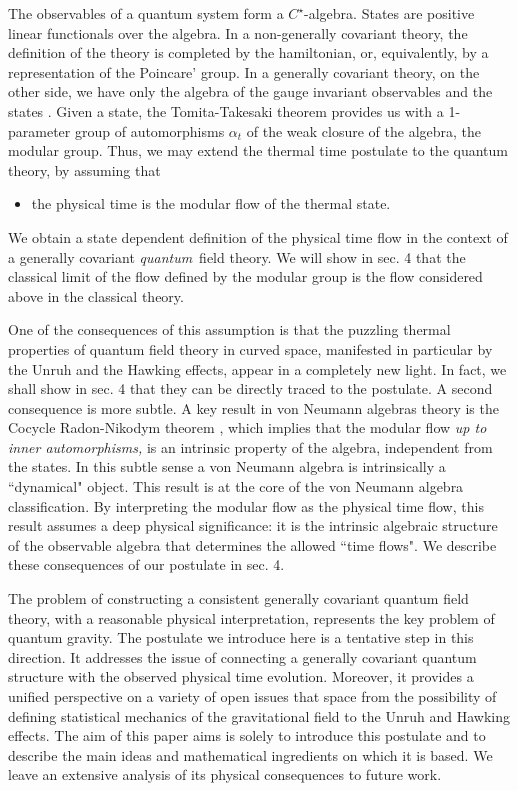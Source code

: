 The observables of a quantum system form a $C^\star$-algebra.
States are positive linear functionals over the algebra.
In a non-generally covariant theory, the definition of the theory
is completed by the hamiltonian, or, equivalently, by a
representation of the Poincare' group.   In a generally covariant
theory, on the other side, we have only the algebra of the gauge
invariant observables and the states \cite{time}.  Given a state,
the Tomita-Takesaki theorem provides us with a 1-parameter
group of automorphisms $\alpha_t$ of the weak closure of the
algebra, the modular
group.   Thus, we may extend the thermal time postulate to the
quantum theory, by assuming that
\begin{itemize}
\item the physical time is the modular flow of the thermal state.
\end{itemize}
We obtain a state dependent definition of the
physical time flow in the context of a generally covariant {\it
quantum\,} field theory.   We will show in sec. 4 that the
classical limit of the flow defined by the modular group is
the flow considered above in the classical theory.

One of the consequences of this assumption is that the puzzling
thermal properties of quantum field theory in curved space,
manifested in particular by the Unruh and the Hawking effects,
appear in a completely new light. In fact, we shall show in sec. 4
that they can be directly traced to the postulate.  A second
consequence is more subtle. A key result in von Neumann algebras
theory is the Cocycle Radon-Nikodym theorem \cite{al},
which implies that the
modular flow {\it up to inner automorphisms, } is an intrinsic
property of the algebra, independent from the states.  In this
subtle sense a von Neumann algebra is intrinsically a ``dynamical"
object.   This result is at the core of the von Neumann algebra
classification.  By interpreting the modular flow as the physical
time flow, this result assumes a deep physical significance: it is
the intrinsic algebraic structure of the observable algebra that
determines the allowed ``time flows".   We describe these
consequences of our postulate in sec. 4.

The problem of constructing a consistent generally
covariant quantum field theory, with a reasonable physical
interpretation, represents the key problem of quantum gravity.
The postulate we introduce here is a tentative step
in this direction.   It addresses the issue of connecting a
generally covariant quantum structure with the observed physical
time evolution.   Moreover, it provides a unified perspective on a
variety of open issues that space from the possibility of defining
statistical mechanics of the gravitational field to the Unruh
and Hawking effects.  The aim of this paper aims is solely to
introduce this postulate and to describe the main ideas and
mathematical ingredients on which it is based.   We leave an
extensive analysis of its physical consequences to future work.

